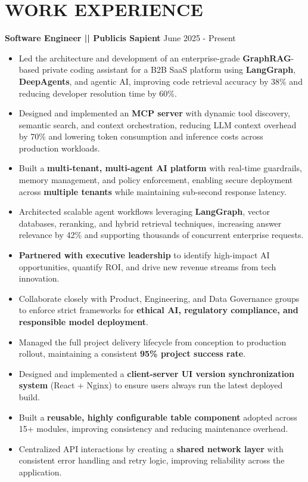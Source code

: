\documentclass[100pt,a4paper]{article}
\begin{document}
\section*{WORK EXPERIENCE}
\textbf{Software Engineer || Publicis Sapient}
\hfill June 2025 - Present
\begin{itemize}
\vspace{2pt}
\item {Led the architecture and development of an enterprise-grade \textbf{GraphRAG}-based private coding assistant for a B2B SaaS platform using \textbf{LangGraph}, \textbf{DeepAgents}, and agentic AI, improving code retrieval accuracy by 38\% and reducing developer resolution time by 60\%.}
\item {Designed and implemented an \textbf{MCP server} with dynamic tool discovery, semantic search, and context orchestration, reducing LLM context overhead by 70\% and lowering token consumption and inference costs across production workloads.}
\item {Built a \textbf{multi-tenant, multi-agent AI platform} with real-time guardrails, memory management, and policy enforcement, enabling secure deployment across \textbf{multiple tenants} while maintaining sub-second response latency.}
\item {Architected scalable agent workflows leveraging \textbf{LangGraph}, vector databases, reranking, and hybrid retrieval techniques, increasing answer relevance by 42\% and supporting thousands of concurrent enterprise requests.}
\item {\textbf{Partnered with executive leadership} to identify high-impact AI opportunities, quantify ROI, and drive new revenue streams from tech innovation.}
\item {Collaborate closely with Product, Engineering, and Data Governance groups to enforce strict frameworks for \textbf{ethical AI, regulatory compliance, and responsible model deployment}.}
\item {Managed the full project delivery lifecycle from conception to production rollout, maintaining a consistent \textbf{95\% project success rate}.}
\item  {Designed and implemented a \textbf{client-server UI version synchronization system} (React + Nginx) to ensure users always run the latest deployed build.}
\item  {Built a \textbf{reusable, highly configurable table component} adopted across 15+ modules, improving consistency and reducing maintenance overhead.}
\item  {Centralized API interactions by creating a \textbf{shared network layer} with consistent error handling and retry logic, improving reliability across the application.}

\end{itemize}
\end{document}
